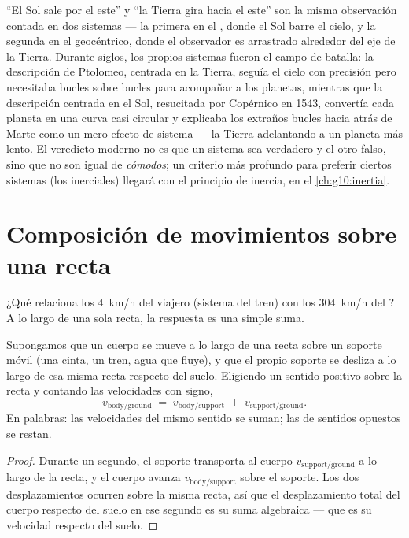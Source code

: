 \begin{remark}\label{rem:g10:relative-motion:history}
``El Sol sale por el este'' y ``la Tierra gira hacia el este'' son la
misma observación contada en dos sistemas --- la primera en el , donde el Sol barre el cielo, y la segunda en el geocéntrico,
donde el observador es arrastrado alrededor del eje de la Tierra.
Durante siglos, los propios sistemas fueron el campo de batalla: la
descripción de Ptolomeo, centrada en la Tierra, seguía el cielo con
precisión pero necesitaba bucles sobre bucles para acompañar a los
planetas, mientras que la descripción centrada en el Sol, resucitada por
Copérnico en 1543, convertía cada planeta en una curva casi circular y
explicaba los extraños bucles hacia atrás de Marte como un mero efecto
de sistema --- la Tierra adelantando a un planeta más lento. El
veredicto moderno no es que un sistema sea verdadero y el otro falso,
sino que no son igual de \emph{cómodos}; un criterio más profundo para
preferir ciertos sistemas (los inerciales) llegará con el principio de
inercia, en el \cref{ch:g10:inertia}.
\end{remark}

\section{Composición de movimientos sobre una recta}

¿Qué relaciona los \qty{4}{km/h} del viajero (sistema del tren) con los
\qty{304}{km/h} del ? A lo largo de una sola recta, la
respuesta es una simple suma.

\begin{proposition}\label{prop:g10:relative-motion:compose}
Supongamos que un cuerpo se mueve a lo largo de una recta sobre un
soporte móvil (una cinta, un tren, agua que fluye), y que el propio
soporte se desliza a lo largo de esa misma recta respecto del suelo.
Eligiendo un sentido positivo sobre la recta y contando las velocidades
con signo,
\[
v_{\text{body/ground}} \;=\; v_{\text{body/support}} \;+\;
v_{\text{support/ground}} .
\]
En palabras: las velocidades del mismo sentido se suman; las de sentidos
opuestos se restan.
\end{proposition}

\begin{proof}
Durante un segundo, el soporte transporta al cuerpo
$v_{\text{support/ground}}$  a lo largo de la recta, y el cuerpo
avanza $v_{\text{body/support}}$  sobre el soporte. Los dos
desplazamientos ocurren sobre la misma recta, así que el desplazamiento
total del cuerpo respecto del suelo en ese segundo es su suma algebraica
--- que es su velocidad respecto del suelo.
\end{proof}

